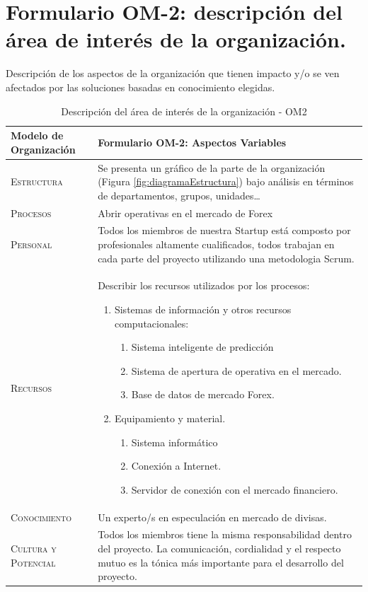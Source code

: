  
\section{Formulario OM-2: descripción del área de interés de la organización.}

Descripción de los aspectos de la organización que tienen impacto y/o se ven afectados
  por las soluciones basadas en conocimiento elegidas.


\begin{table}[H]
\scriptsize
\begin{tabularx}{\textwidth}{|l|X|} \hline
\textbf{Modelo de Organización} & \textbf{Formulario OM-2: Aspectos Variables} \\ \hline\hline

\textsc{Estructura} & Se presenta un gráfico de la parte de la organización (Figura \ref{fig:diagramaEstructura}) bajo análisis en términos de departamentos, grupos, unidades\dots\\ \hline

\textsc{Procesos} & Abrir operativas en el mercado de Forex\\ \hline
\textsc{Personal} &  Todos los miembros de nuestra Startup está composto por profesionales altamente cualificados, todos trabajan en cada parte del proyecto utilizando una metodologia Scrum.\\ \hline
\textsc{Recursos} &  Describir los recursos utilizados por los procesos:
\begin{enumerate}
    \item Sistemas de información y otros recursos computacionales:
    \begin{enumerate}
      \item Sistema inteligente de predicción
      \item Sistema de apertura de operativa en el mercado.
      \item Base de datos de mercado Forex.
    \end{enumerate}
    \item Equipamiento y material.
    \begin{enumerate}
      \item Sistema informático
      \item Conexión a Internet.
      \item Servidor de conexión con el mercado financiero.
    \end{enumerate}
\end{enumerate}
\\ \hline
\textsc{Conocimiento} &  Un experto/s en especulación en mercado de divisas.\\ \hline
\textsc{Cultura y Potencial} &  Todos los miembros tiene la misma responsabilidad dentro del proyecto. La comunicación, cordialidad y el respecto mutuo es la tónica más importante para el desarrollo del proyecto.\\ \hline
\end{tabularx}
  \caption{\label{tab:OM2}Descripción del área de interés de la organización - OM2}
\end{table}


